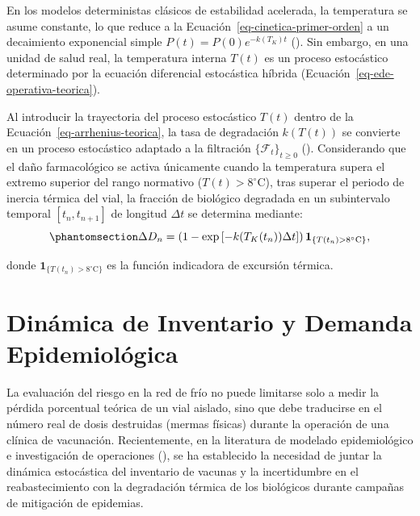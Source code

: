 \documentclass[
  spanish,
  us-letterpaper,
]{scrreprt}
\numberwithin{equation}{section}
\theoremstyle{plain}
\theoremstyle{plain}
\theoremstyle{definition}
\theoremstyle{plain}
\theoremstyle{remark}
\begin{document}
En los modelos deterministas clásicos de estabilidad acelerada, la
temperatura se asume constante, lo que reduce a la
Ecuación~\ref{eq-cinetica-primer-orden} a un decaimiento exponencial
simple \(P(t) = P(0)e^{-k(T_K)t}\)
(). Sin
embargo, en una unidad de salud real, la temperatura interna \(T(t)\) es
un proceso estocástico determinado por la ecuación diferencial
estocástica híbrida (Ecuación~\ref{eq-ede-operativa-teorica}).

Al introducir la trayectoria del proceso estocástico \(T(t)\) dentro de
la Ecuación~\ref{eq-arrhenius-teorica}, la tasa de degradación
\(k(T(t))\) se convierte en un proceso estocástico adaptado a la
filtración \(\{\mathcal{F}_t\}_{t \ge 0}\)
(). Considerando que el daño farmacológico se activa únicamente
cuando la temperatura supera el extremo superior del rango normativo
(\(T(t) > 8^\circ\text{C}\)), tras superar el periodo de inercia térmica
del vial, la fracción de biológico degradada en un subintervalo temporal
\([t_n, t_{n+1}]\) de longitud \(\Delta t\) se determina mediante:
\begin{equation}\phantomsection\label{eq-fraccion-dano-paso}{
\Delta D_n = \left( 1 - \exp\left[ -k(T_K(t_n)) \Delta t \right] \right) \mathbf{1}_{\{T(t_n) > 8^\circ\text{C}\}},
}\end{equation}

donde \(\mathbf{1}_{\{T(t_n) > 8^\circ\text{C}\}}\) es la función
indicadora de excursión térmica.

\section{Dinámica de Inventario y Demanda
Epidemiológica}\label{sec-fundamento-inventario-seir}

La evaluación del riesgo en la red de frío no puede limitarse solo a
medir la pérdida porcentual teórica de un vial aislado, sino que debe
traducirse en el número real de dosis destruidas (mermas físicas)
durante la operación de una clínica de vacunación. Recientemente, en la
literatura de modelado epidemiológico e investigación de operaciones
(), se ha establecido la necesidad de juntar la dinámica estocástica
del inventario de vacunas y la incertidumbre en el reabastecimiento con
la degradación térmica de los biológicos durante campañas de mitigación
de epidemias.
\end{document}
